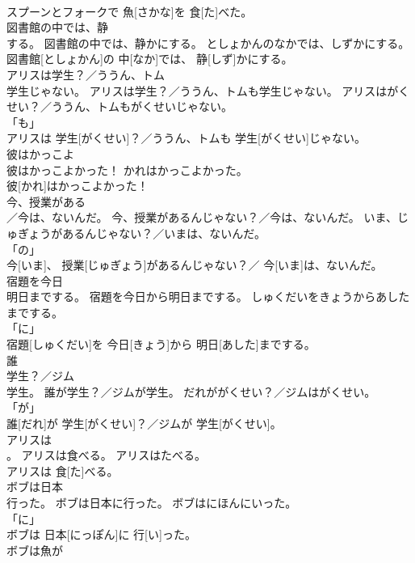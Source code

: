 \documentclass[8pt]{extreport}
\begin{document}
\begin{CJK}{UTF8}{min}
\\	スプーンとフォークで 魚[さかな]を 食[た]べた。		
\\	図書館の中では、静
\\	する。	図書館の中では、静かにする。	としょかんのなかでは、しずかにする。	
\\	図書館[としょかん]の 中[なか]では、 静[しず]かにする。		
\\	アリスは学生？／ううん、トム
\\	学生じゃない。	アリスは学生？／ううん、トムも学生じゃない。	アリスはがくせい？／ううん、トムもがくせいじゃない。	
\\	「も」 
\\	アリスは 学生[がくせい]？／ううん、トムも 学生[がくせい]じゃない。		
\\	彼はかっこよ
\\	彼はかっこよかった！	かれはかっこよかった。	
\\	彼[かれ]はかっこよかった！		
\\	今、授業がある
\\	／今は、ないんだ。	今、授業があるんじゃない？／今は、ないんだ。	いま、じゅぎょうがあるんじゃない？／いまは、ないんだ。	
\\	「の」 
\\	今[いま]、 授業[じゅぎょう]があるんじゃない？／ 今[いま]は、ないんだ。		
\\	宿題を今日
\\	明日までする。	宿題を今日から明日までする。	しゅくだいをきょうからあしたまでする。	
\\	「に」 
\\	宿題[しゅくだい]を 今日[きょう]から 明日[あした]までする。		
\\	誰
\\	学生？／ジム
\\	学生。	誰が学生？／ジムが学生。	だれががくせい？／ジムはがくせい。	
\\	「が」 
\\	誰[だれ]が 学生[がくせい]？／ジムが 学生[がくせい]。		
\\	アリスは
\\	。	アリスは食べる。	アリスはたべる。	
\\	アリスは 食[た]べる。		
\\	ボブは日本
\\	行った。	ボブは日本に行った。	ボブはにほんにいった。	
\\	「に」 
\\	ボブは 日本[にっぽん]に 行[い]った。		
\\	ボブは魚が

\end{CJK}
\end{document}
